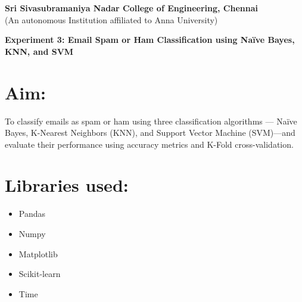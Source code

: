 \documentclass[11pt]{article}
\begin{document}
\begin{center}
    \large \textbf{Sri Sivasubramaniya Nadar College of Engineering, Chennai} \\
    (An autonomous Institution affiliated to Anna University) \\
    \vspace{0.3cm}
\end{center}

\begin{table}[!h]
\renewcommand{\arraystretch}{1.5}
\end{table}

\vspace{0.5cm}

\begin{center}
 \textbf{Experiment 3: Email Spam or Ham Classification using Naïve Bayes, KNN, and SVM}
\end{center}

\noindent
\section{Aim:} 
 To classify emails as spam or ham using three classification algorithms — Naïve Bayes, K-Nearest Neighbors (KNN), and Support Vector Machine (SVM)—and evaluate their performance using accuracy metrics and K-Fold cross-validation.

\vspace{0.4cm}
\noindent
\section{Libraries used:}
\begin{itemize}
    \item {Pandas}
    \item {Numpy}
    \item {Matplotlib}
    \item {Scikit-learn}
    \item {Time}
\end{itemize}
\end{document}

